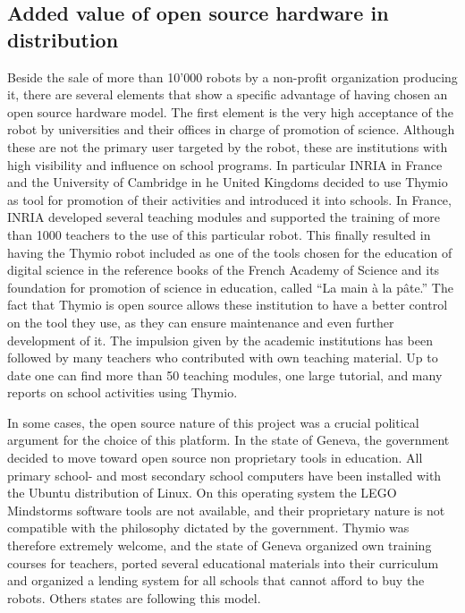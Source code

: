 \documentclass[letterpaper, 10 pt, conference]{ieeeconf}  %
\begin{document}
\subsection{Added value of open source hardware in distribution}

Beside the sale of more than 10'000 robots by a non-profit organization producing it, there are several elements that show a specific advantage of having chosen an open source hardware model.
The first element is the very high acceptance of the robot by universities and their offices in charge of promotion of science.
Although these are not the primary user targeted by the robot, these are institutions with high visibility and influence on school programs. 
In particular INRIA in France and the University of Cambridge in he United Kingdoms decided to use Thymio as tool for promotion of their activities and introduced it into schools.
In France, INRIA developed several teaching modules and supported the training of more than 1000 teachers to the use of this particular robot. 
This finally resulted in having the Thymio robot included as one of the tools chosen for the education of digital science in the reference books of the French Academy of Science and its foundation for promotion of science in education, called ``La main \`a la p\^ate.''
The fact that Thymio is open source allows these institution to have a better control on the tool they use, as they can ensure maintenance and even further development of it. 
The impulsion given by the academic institutions has been followed by many teachers who contributed with own teaching material. 
Up to date one can find more than 50 teaching modules, one large tutorial, and many reports on school activities using Thymio. 

In some cases, the open source nature of this project was a crucial political argument for the choice of this platform.
In the state of Geneva, the government decided to move toward open source non proprietary tools in education.
All primary school- and most secondary school computers have been installed with the Ubuntu distribution of Linux. 
On this operating system the LEGO Mindstorms software tools are not available, and their proprietary nature is not compatible with the philosophy dictated by the government. 
Thymio was therefore extremely welcome, and the state of Geneva organized own training courses for teachers, ported several educational materials into their curriculum and organized a lending system for all schools that cannot afford to buy the robots.
Others states are following this model.
\end{document}
